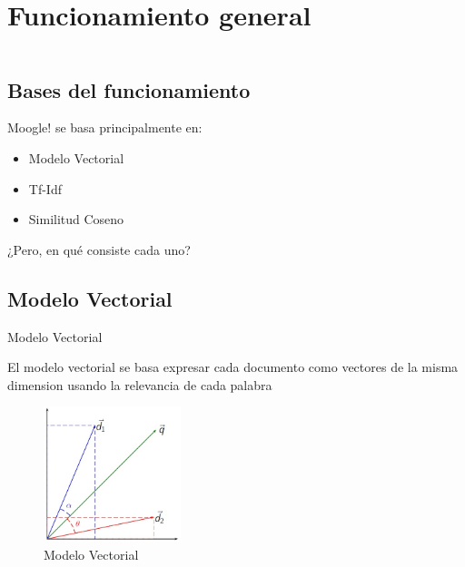 \section{Funcionamiento general}

\begin{frame}
    \begin{columns}[t]
        \begin{column}{.5\textwidth}
          \tableofcontents[sections={1-2},currentsection]
        \end{column}
        \begin{column}{.5\textwidth}
          \tableofcontents[sections={3-4},currentsection]
        \end{column}
    \end{columns}
\end{frame}

\subsection{Bases del funcionamiento}
\begin{frame}[fragile]{}

Moogle! se basa principalmente en:
\begin{itemize}
\item Modelo Vectorial
\item Tf-Idf
\item Similitud Coseno

\end{itemize}

\pause
\vspace{5mm}
¿Pero, en qué consiste cada uno?

\end{frame}

\subsection{Modelo Vectorial}
\begin{frame}[fragile]{Modelo Vectorial}

El modelo vectorial se basa expresar cada
documento como vectores de la misma dimension usando la relevancia de cada palabra
\pause

\begin{figure}[h]
    \center
    \includegraphics[width=4cm]{Vectormodel.jpg}
    \caption{Modelo Vectorial}
\end{figure}

\end{frame}

